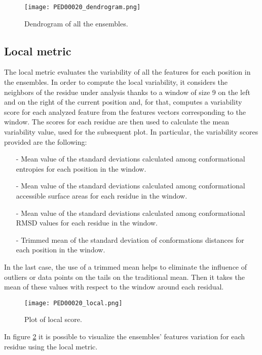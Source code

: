\begin{figure}[H]
    \centering
		\texttt{[image: PED00020\_dendrogram.png]}
		\caption{Dendrogram of all the ensembles.}
		\label{dendrogram}
\end{figure}


\subsection{Local metric}
The local metric evaluates the variability of all the features for each position in the ensembles.
In order to compute the local variability, it considers the neighbors of the residue under analysis thanks to a window of size 9 on the left and on the right of the current position and, for that, computes a variability score for each analyzed feature from the features vectors corresponding to the window. The scores for each residue are then used to calculate the mean variability value, used for the subsequent plot. In particular, the variability scores provided are the following:

\begin{itemize}
\item[-] Mean value of the standard deviations calculated among conformational entropies for each position in the window.
\item[-] Mean value of the standard deviations calculated among conformational accessible surface areas for each residue in the window.
\item[-] Mean value of the standard deviations calculated among conformational RMSD values for each residue in the window. 
\item[-] Trimmed mean of the standard deviation of conformations distances for each position in the window. 
\end{itemize}

In the last case, the use of a trimmed mean helps to eliminate the influence of outliers or data points on the tails on the traditional mean. Then it takes the mean of these values with respect to the window around each residual.

\begin{figure}[H]
    \centering
		\texttt{[image: PED00020\_local.png]}
		\caption{Plot of local score.}
		\label{plot}
\end{figure}


In figure \ref{plot} it is possible to visualize the ensembles' features variation for each residue using the local metric. 


